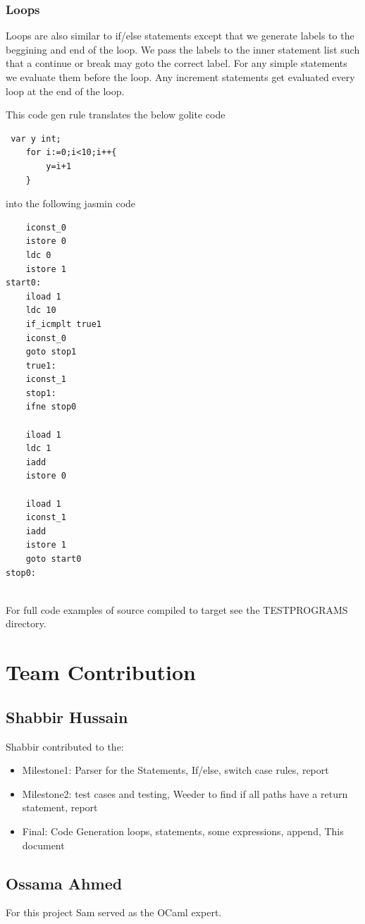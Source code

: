\documentclass{article}
\begin{document}
\subsubsection*{Loops}
Loops are also similar to if/else statements except that we generate labels to the beggining and end of the loop. We pass the labels to the inner statement list such that a continue or break may goto the correct label. For any simple statements we evaluate them before the loop. Any increment statements get evaluated every loop at the end of the loop.

This code gen rule translates the below golite code
\begin{lstlisting}
 var y int;
    for i:=0;i<10;i++{
        y=i+1
    }

\end{lstlisting}
into the following jasmin code
\begin{lstlisting}
	iconst_0
	istore 0
	ldc 0
	istore 1
start0:
	iload 1
	ldc 10
	if_icmplt true1
	iconst_0
	goto stop1
	true1:
	iconst_1
	stop1:
	ifne stop0

	iload 1
	ldc 1
	iadd
	istore 0
	
	iload 1
	iconst_1
	iadd
	istore 1
	goto start0
stop0:


\end{lstlisting}

For full code examples of source compiled to target see the TESTPROGRAMS directory.

\section{Team Contribution}

\subsection{Shabbir Hussain}
Shabbir contributed to the:

\begin{itemize}
\item Milestone1: Parser for the Statements, If/else, switch case rules, report
\item Milestone2: test cases and testing, Weeder to find if all paths have a return statement, report
\item Final: Code Generation loops, statements, some expressions, append, This document
\end{itemize}


\subsection{Ossama Ahmed}
For this project Sam served as the OCaml expert. 
\end{document}
